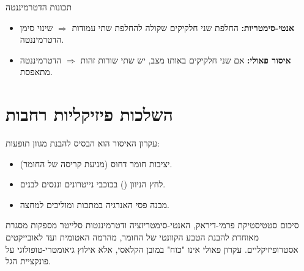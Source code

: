 \begin{notebox}{תכונות הדטרמיננטה}
\begin{itemize}
    \item \textbf{אנטי-סימטריות:} החלפת שני חלקיקים שקולה להחלפת שתי עמודות $\Rightarrow$ שינוי סימן הדטרמיננטה.
    \item \textbf{איסור פאולי:} אם שני חלקיקים באותו מצב, יש שתי שורות זהות $\Rightarrow$ הדטרמיננטה מתאפסת.
\end{itemize}
\end{notebox}



\section{השלכות פיזיקליות רחבות}
עקרון האיסור הוא הבסיס להבנת מגוון תופעות:
\begin{itemize}
    \item יציבות חומר דחוס (מניעת קריסה של החומר).
    \item לחץ הניוון () בכוכבי נייטרונים וננסים לבנים.
    \item מבנה פסי האנרגיה במתכות ומוליכים למחצה.
\end{itemize}

\begin{summarybox}{סיכום}
סטטיסטיקת פרמי-דיראק, האנטי-סימטריזציה ודטרמיננטות סלייטר מספקות מסגרת מאוחדת להבנת הטבע הקוונטי של החומר, מהרמה האטומית ועד לאובייקטים אסטרופיזיקליים. עקרון פאולי אינו "כוח" במובן הקלאסי, אלא אילוץ גיאומטרי-טופולוגי על פונקציית הגל.
\end{summarybox}

